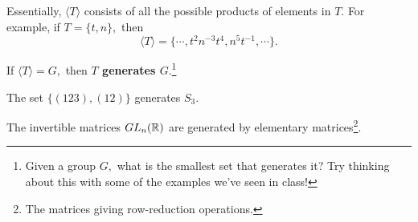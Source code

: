 Essentially, $\langle T \rangle$ consists of all the possible products of elements in $T.$ For example, if $T = \{t, n\},$ then \[
\langle T \rangle = \{\cdots, t^2n^{-3}t^4, n^5t^{-1}, \cdots \}.
\]
\begin{definition}
If $\langle T \rangle = G,$ then \textbf{$T$ generates $G.$}\footnote{Given a group $G,$ what is the smallest set that generates it? Try thinking about this with some of the examples we've seen in class!}
\end{definition}

\begin{example}
The set $\{(123), (12)\}$ generates $S_3.$ 
\end{example}
\begin{example}
The invertible matrices $GL_n(\mathbb R)$ are generated by elementary matrices\footnote{The matrices giving row-reduction operations.}.
\end{example}

\newpage